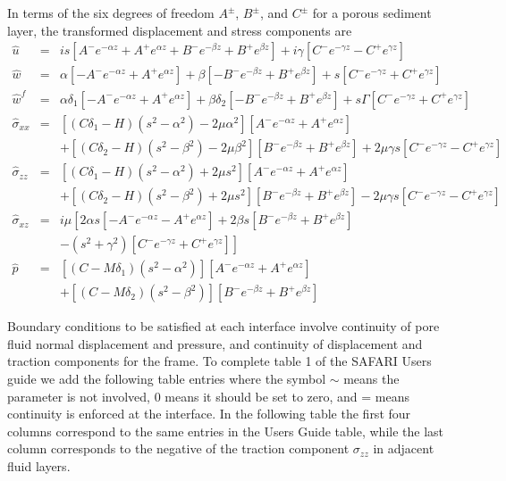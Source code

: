 In terms of the six degrees of freedom $A^{\pm}$, $B^{\pm}$, and
$C^{\pm}$  for a porous sediment layer, the transformed displacement
and stress components are
\begin{eqnarray*}
\hat{u} & = & i s [ A^- e^{- \alpha z} + A^+ e^{\alpha z} + B^-
e^{-\beta z} + B^+ e^{\beta z}] + i \gamma [ C^- e^{- \gamma z} - C^+
e^{\gamma z}] \\
\hat{w} & = & \alpha [- A^- e^{- \alpha z} + A^+ e^{\alpha z}] +
\beta [ - B^- e^{-\beta z} + B^+ e^{\beta z}] + s [ C^- e^{-
\gamma z} + C^+ e^{\gamma z}] \\
\hat{w}^f & = & \alpha \delta_1 [- A^- e^{- \alpha z} + A^+ e^{\alpha
z}] +
\beta \delta_2 [ - B^- e^{-\beta z} + B^+ e^{\beta z}] + s \Gamma [ C^-
e^{-
\gamma z} + C^+ e^{\gamma z}] \\
\hat{\sigma}_{xx} & = & [( C \delta_1 - H)(s^2 - \alpha^2) - 2 \mu
\alpha^2] [ A^- e^{- \alpha z} + A^+ e^{\alpha z} ] \\
 & & + [( C \delta_2 - H)(s^2 - \beta^2) - 2 \mu
\beta^2] [ B^- e^{- \beta z} + B^+ e^{\beta z} ] + 2 \mu \gamma s [ C^-
e^{-
\gamma z} - C^+ e^{\gamma z}] \\
\hat{\sigma}_{zz} & = & [( C \delta_1 - H)(s^2 - \alpha^2) + 2 \mu
s^2] [ A^- e^{- \alpha z} + A^+ e^{\alpha z} ] \\
 & & + [( C \delta_2 - H)(s^2 - \beta^2) + 2 \mu
s^2] [ B^- e^{- \beta z} + B^+ e^{\beta z} ] - 2 \mu \gamma s [ C^-
e^{-\gamma z} - C^+ e^{\gamma z}] \\
\hat{\sigma}_{xz} & = & i \mu
\left[
2 \alpha s [- A^- e^{- \alpha z} - A^+ e^{\alpha z}] + 2 \beta s
[ B^- e^{- \beta z} + B^+ e^{\beta z} ] \right. \\
 & &  \left. - (s^2 + \gamma^2 ) [ C^- e^{- \gamma z} + C^+
e^{\gamma z}] \right] \\
\hat{p} & = & [ ( C - M \delta_1 )( s^2 - \alpha^2 )] [ A^- e^{-
\alpha z} + A^+ e^{\alpha z} ] \\
 & &  + [ ( C - M \delta_2 )( s^2 - \beta^2
)] [ B^- e^{- \beta z} + B^+ e^{\beta z} ]
\end{eqnarray*}

Boundary conditions to be satisfied at each interface involve
continuity of pore fluid normal  displacement and pressure, and
continuity of displacement and traction components for the frame.  To
complete table 1 of the SAFARI Users guide we add the following table
entries where the symbol $\sim$ means the parameter is not involved,
0 means it should be set to zero, and = means continuity is
enforced at the interface.
In the following table the first four columns correspond to the same
entries in the Users Guide table, while the last column corresponds to
the negative of the traction component $\sigma_{zz}$ in adjacent fluid
layers.

